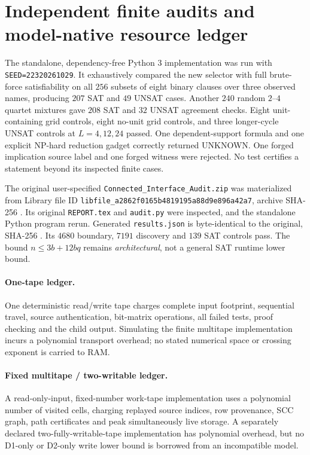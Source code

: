 \documentclass[11pt]{article}
\begin{document}
\section{Independent finite audits and model-native resource ledger}
The standalone, dependency-free Python 3 implementation was run with
\texttt{SEED=22320261029}. It exhaustively compared the new selector
with full brute-force satisfiability on all $256$ subsets of eight
binary clauses over three observed names, producing $207$ SAT and $49$
UNSAT cases. Another $240$ random $2$--$4$ quartet mixtures gave
$208$ SAT and $32$ UNSAT agreement checks. Eight unit-containing
grid controls, eight no-unit grid controls, and three longer-cycle UNSAT
controls at $L=4,12,24$ passed. One dependent-support formula and one
explicit NP-hard reduction gadget correctly returned UNKNOWN.
One forged implication source label and one forged witness were rejected.
No test certifies a statement beyond its inspected finite cases.

The original user-specified \texttt{Connected\_Interface\_Audit.zip}
was materialized from Library file ID
\texttt{libfile\_a2862f0165b4819195a88d9e896a42a7}, archive SHA-256
\texttt{}.
Its original \texttt{REPORT.tex} and \texttt{audit.py} were inspected,
and the standalone Python program rerun. Generated
\texttt{results.json} is byte-identical to the original, SHA-256
\texttt{}.
Its $4680$ boundary, $7191$ discovery and $139$ SAT controls pass.
The bound $n\le3b+12bq$ remains \emph{architectural}, not a general
SAT runtime lower bound.

\paragraph{One-tape ledger.}
One deterministic read/write tape charges complete input footprint,
sequential travel, source authentication, bit-matrix operations,
all failed tests, proof checking and the child output. Simulating the
finite multitape implementation incurs a polynomial transport overhead;
no stated numerical space or crossing exponent is carried to RAM.

\paragraph{Fixed multitape / two-writable ledger.}
A read-only-input, fixed-number work-tape implementation uses a
polynomial number of visited cells, charging replayed source indices,
row provenance, SCC graph, path certificates and peak simultaneously
live storage. A separately declared two-fully-writable-tape
implementation has polynomial overhead, but no D1-only or D2-only
write lower bound is borrowed from an incompatible model.
\end{document}
